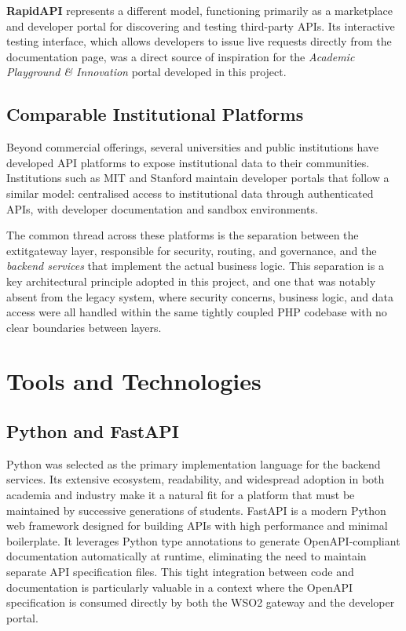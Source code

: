 \documentclass[12pt, a4paper]{report}
\begin{document}
	\textbf{RapidAPI} represents a different model, functioning primarily as a marketplace
and developer portal for discovering and testing third-party APIs. Its interactive
testing interface, which allows developers to issue live requests directly from
the documentation page, was a direct source of inspiration for the
\textit{Academic Playground \& Innovation} portal developed in this project.

\subsection{Comparable Institutional Platforms}

Beyond commercial offerings, several universities and public institutions have
developed API platforms to expose institutional data to their communities.
Institutions such as MIT and Stanford maintain developer portals that follow a similar
model: centralised access to institutional data through authenticated APIs, with
developer documentation and sandbox environments.

The common thread across these platforms is the separation between the
	extit{gateway layer}, responsible for security, routing, and governance,
and the \textit{backend services} that implement the actual business logic.
This separation is a key architectural principle adopted in this project, and one
that was notably absent from the legacy system, where security concerns, business
logic, and data access were all handled within the same tightly coupled PHP codebase
with no clear boundaries between layers.

\section{Tools and Technologies}

\subsection{Python and FastAPI}
Python was selected as the primary implementation language for the backend services.
Its extensive ecosystem, readability, and widespread adoption in both academia and
industry make it a natural fit for a platform that must be maintained by successive
generations of students. FastAPI is a modern Python web framework designed for
building APIs with high performance and minimal boilerplate. It leverages Python
type annotations to generate OpenAPI-compliant documentation automatically at
runtime, eliminating the need to maintain separate API specification files.
This tight integration between code and documentation is particularly valuable
in a context where the OpenAPI specification is consumed directly by both the
WSO2 gateway and the developer portal.
\end{document}
